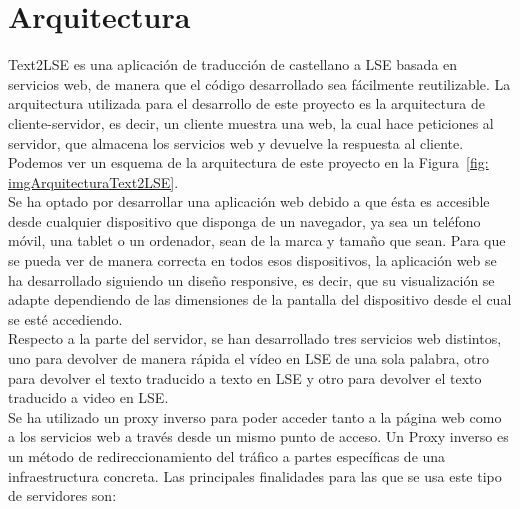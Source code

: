 \section{Arquitectura}
\label{cap4:sec:Arquitectura}

Text2LSE es una aplicación de traducción de castellano a LSE basada en servicios web, de manera que el código desarrollado sea fácilmente reutilizable. La arquitectura utilizada para el desarrollo de este proyecto es la arquitectura de cliente-servidor, es decir, un cliente muestra una web, la cual hace peticiones al servidor, que almacena los servicios web y devuelve la respuesta al cliente. Podemos ver un esquema de la arquitectura de este proyecto en la Figura~\ref {fig: imgArquitecturaText2LSE}.\\

Se ha optado por desarrollar una aplicación web debido a que ésta es accesible desde cualquier dispositivo que disponga de un navegador, ya sea un teléfono móvil, una tablet o un ordenador, sean de la marca y tamaño que sean. Para que se pueda ver de manera correcta en todos esos dispositivos, la aplicación web se ha desarrollado siguiendo un diseño responsive, es decir, que su visualización se adapte dependiendo de las dimensiones de la pantalla del dispositivo desde el cual se esté accediendo.\\

Respecto a la parte del servidor, se han desarrollado tres servicios web distintos, uno para devolver de manera rápida el vídeo en LSE de una sola palabra, otro para devolver el texto traducido a texto en LSE y otro para devolver el texto traducido a video en LSE. \\

Se ha utilizado un proxy inverso para poder acceder tanto a la página web como a los servicios web a través desde un mismo punto de acceso. Un Proxy inverso \citep*{proxyInverso} es un método de redireccionamiento del tráfico a partes específicas de una infraestructura concreta. Las principales finalidades para las que se usa este tipo de servidores son:

